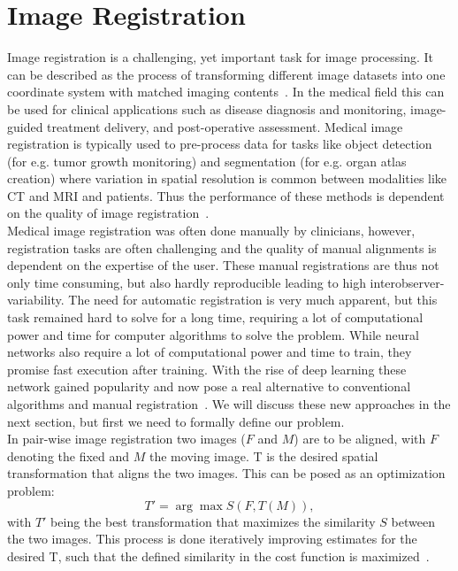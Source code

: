\documentclass[english,version-2022-01]{uzl-thesis} %
\begin{document}
\section{Image Registration} \label{Sec:ImageRegistration}
Image registration is a challenging, yet important task for image processing. It can be described as the process of transforming different image datasets into one coordinate system with matched imaging contents~\cite{Haskins2020}. In the medical field this can be used for clinical applications such as disease diagnosis and monitoring, image-guided treatment delivery, and post-operative assessment. Medical image registration is typically used to pre-process data for tasks like object detection (for e.g. tumor growth monitoring) and segmentation (for e.g. organ atlas creation) where variation in spatial resolution is common between modalities like CT and MRI and patients. Thus the performance of these methods is dependent on the quality of image registration~\cite{Chen2020}. \\
Medical image registration was often done manually by clinicians, however, registration tasks are often challenging and the quality of manual alignments is dependent on the expertise of the user. These manual registrations are thus not only time consuming, but also hardly reproducible leading to high interobserver-variability. The need for automatic registration is very much apparent, but this task remained hard to solve for a long time, requiring a lot of computational power and time for computer algorithms to solve the problem. While neural networks also require a lot of computational power and time to train, they promise fast execution after training. With the rise of deep learning these network gained popularity and now pose a real alternative to conventional algorithms and manual registration~\cite{Haskins2020}. We will discuss these new approaches in the next section, but first we need to formally define our problem.\\
In pair-wise image registration two images ($F$ and $M$) are to be aligned, with $F$ denoting the fixed and $M$ the moving image. T is the desired spatial transformation that aligns the two images. This can be posed as an optimization problem:
\begin{equation}
	T' = \arg\max S(F, T(M)),
\end{equation}
with $T'$ being the best transformation that maximizes the similarity $S$ between the two images. This process is done iteratively improving estimates for the desired T, such that the defined similarity in the cost function is maximized~\cite{Chen2020}.\\
\end{document}
